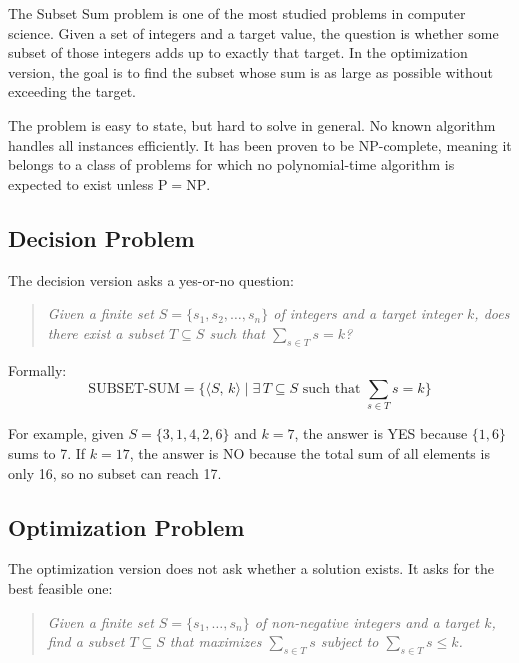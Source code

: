 \documentclass[12pt,a4paper]{article}
\theoremstyle{definition}
\begin{document}
The Subset Sum problem is one of the most studied problems in computer science.
Given a set of integers and a target value, the question is whether some subset
of those integers adds up to exactly that target. In the optimization version, the
goal is to find the subset whose sum is as large as possible without exceeding the target.

The problem is easy to state, but hard to solve in general. No known algorithm
handles all instances efficiently. It has been proven to be NP-complete, meaning
it belongs to a class of problems for which no polynomial-time algorithm is
expected to exist unless $\mathrm{P} = \mathrm{NP}$.

\subsection{Decision Problem}

The decision version asks a yes-or-no question:

\begin{quote}
  \textit{Given a finite set $S = \{s_1, s_2, \ldots, s_n\}$ of integers and
  a target integer $k$, does there exist a subset $T \subseteq S$ such that
  $\sum_{s \in T} s = k$?}
\end{quote}

Formally:
\[
  \mathrm{SUBSET\text{-}SUM}
    = \bigl\{\langle S,\, k \rangle
       \mid \exists\, T \subseteq S \text{ such that } \textstyle\sum_{s \in T} s = k
      \bigr\}
\]

For example, given $S = \{3, 1, 4, 2, 6\}$ and $k = 7$, the answer is YES
because $\{1, 6\}$ sums to 7. If $k = 17$, the answer is NO because the
total sum of all elements is only 16, so no subset can reach 17.

\subsection{Optimization Problem}

The optimization version does not ask whether a solution exists. It asks for
the best feasible one:

\begin{quote}
  \textit{Given a finite set $S = \{s_1, \ldots, s_n\}$ of non-negative integers
  and a target $k$, find a subset $T \subseteq S$ that maximizes
  $\sum_{s \in T} s$ subject to $\sum_{s \in T} s \leq k$.}
\end{quote}
\end{document}
